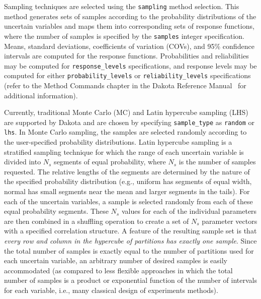 Sampling techniques are selected using the \texttt{sampling}
method selection. This method generates sets of samples according to
the probability distributions of the uncertain variables and maps them
into corresponding sets of response functions, where the number of
samples is specified by the \texttt{samples} integer specification.
Means, standard deviations, coefficients of variation (COVs), and 95\%
confidence intervals are computed for the response functions.
Probabilities and reliabilities may be computed for 
\texttt{response\_levels} specifications, and response levels may be
computed for either \texttt{probability\_levels} or
\texttt{reliability\_levels} specifications (refer to the Method
Commands chapter in the Dakota Reference Manual~\cite{RefMan} for
additional information).

Currently, traditional Monte Carlo (MC) and Latin hypercube sampling
(LHS) are supported by Dakota and are chosen by specifying
\texttt{sample\_type} as \texttt{random} or \texttt{lhs}. In Monte
Carlo sampling, the samples are selected randomly according to the
user-specified probability distributions. Latin hypercube sampling is
a stratified sampling technique for which the range of each uncertain
variable is divided into $N_{s}$ segments of equal probability, where
$N_{s}$ is the number of samples requested. The relative lengths of
the segments are determined by the nature of the specified probability
distribution (e.g., uniform has segments of equal width, normal has
small segments near the mean and larger segments in the tails). For
each of the uncertain variables, a sample is selected randomly from
each of these equal probability segments. These $N_{s}$ values for
each of the individual parameters are then combined in a shuffling
operation to create a set of $N_{s}$ parameter vectors with a
specified correlation structure. A feature of the resulting sample set
is that 
\emph{every row and column in the hypercube of partitions has exactly one sample}.
Since the total number of samples is exactly equal
to the number of partitions used for each uncertain variable, an
arbitrary number of desired samples is easily accommodated (as
compared to less flexible approaches in which the total number of
samples is a product or exponential function of the number of
intervals for each variable, i.e., many classical design of
experiments methods).

